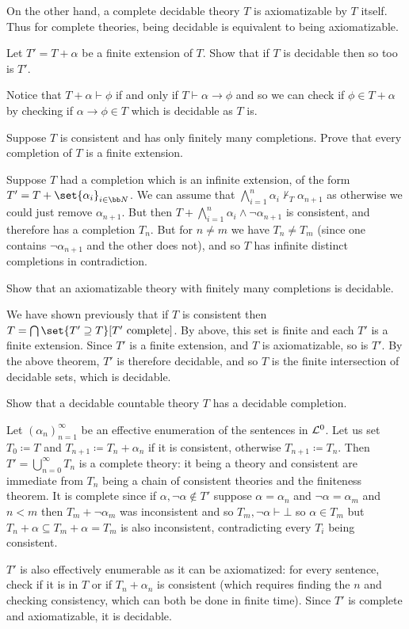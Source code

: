 On the other hand, a complete decidable theory $T$ is axiomatizable by $T$ itself.
Thus for complete theories, being decidable is equivalent to being axiomatizable.

\bexerc

    Let $T'=T+\alpha$ be a finite extension of $T$.
    Show that if $T$ is decidable then so too is $T'$.

\eexerc

Notice that $T+\alpha\vdash\phi$ if and only if $T\vdash\alpha\to\phi$ and so we can check if $\phi\in T+\alpha$ by checking if $\alpha\to\phi\in T$ which is decidable as $T$ is.

\bexerc

    Suppose $T$ is consistent and has only finitely many completions.
    Prove that every completion of $T$ is a finite extension.

\eexerc

Suppose $T$ had a completion which is an infinite extension, of the form $T'=T+\set{\alpha_i}_{i\in {\bb N}}$.
We can assume that $\bigwedge_{i=1}^n\alpha_i\nvdash_T\alpha_{n+1}$ as otherwise we could just remove $\alpha_{n+1}$.
But then $T+\bigwedge_{i=1}^n\alpha_i\land\neg\alpha_{n+1}$ is consistent, and therefore has a completion $T_n$.
But for $n\neq m$ we have $T_n\neq T_m$ (since one contains $\neg\alpha_{n+1}$ and the other does not), and so $T$ has infinite distinct completions in contradiction.

\bexerc

    Show that an axiomatizable theory with finitely many completions is decidable.

\eexerc

We have shown previously that if $T$ is consistent then $T=\bigcap\set{T'\supseteq T}[T'\hbox{ complete}]$.
By above, this set is finite and each $T'$ is a finite extension.
Since $T'$ is a finite extension, and $T$ is axiomatizable, so is $T'$.
By the above theorem, $T'$ is therefore decidable, and so $T$ is the finite intersection of decidable sets, which is decidable.

\bexerc

    Show that a decidable countable theory $T$ has a decidable completion.

\eexerc

Let $(\alpha_n)_{n=1}^\infty$ be an effective enumeration of the sentences in ${\cal L}^0$.
Let us set $T_0\coloneqq T$ and $T_{n+1}\coloneqq T_n+\alpha_n$ if it is consistent, otherwise $T_{n+1}\coloneqq T_n$.
Then $T'=\bigcup_{n=0}^\infty T_n$ is a complete theory: it being a theory and consistent are immediate from $T_n$ being a chain of consistent theories and the finiteness theorem.
It is complete since if $\alpha,\neg\alpha\notin T'$ suppose $\alpha=\alpha_n$ and $\neg\alpha=\alpha_m$ and $n<m$ then $T_m+\neg\alpha_m$ was inconsistent and so $T_m,\neg\alpha\vdash\bot$ so
$\alpha\in T_m$ but $T_n+\alpha\subseteq T_m+\alpha=T_m$ is also inconsistent, contradicting every $T_i$ being consistent.

$T'$ is also effectively enumerable as it can be axiomatized: for every sentence, check if it is in $T$ or if $T_n+\alpha_n$ is consistent (which requires finding the $n$ and checking consistency, which
can both be done in finite time).
Since $T'$ is complete and axiomatizable, it is decidable.


